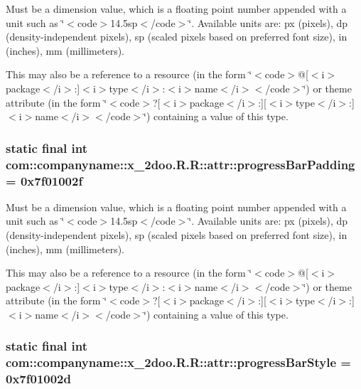 Must be a dimension value, which is a floating point number appended with a unit such as \char`\"{}$<$code$>$14.5sp$<$/code$>$\char`\"{}. Available units are: px (pixels), dp (density-independent pixels), sp (scaled pixels based on preferred font size), in (inches), mm (millimeters). 

This may also be a reference to a resource (in the form \char`\"{}$<$code$>$@\mbox{[}$<$i$>$package$<$/i$>$:\mbox{]}$<$i$>$type$<$/i$>$:$<$i$>$name$<$/i$>$$<$/code$>$\char`\"{}) or theme attribute (in the form \char`\"{}$<$code$>$?\mbox{[}$<$i$>$package$<$/i$>$:\mbox{]}\mbox{[}$<$i$>$type$<$/i$>$:\mbox{]}$<$i$>$name$<$/i$>$$<$/code$>$\char`\"{}) containing a value of this type. \hypertarget{classcom_1_1companyname_1_1x__2doo_1_1_r_1_1attr_95037778c73e5ec76da2313587e3f44f}{
\subsubsection[{progressBarPadding}]{\setlength{\rightskip}{0pt plus 5cm}static final int com::companyname::x\_\-2doo.R.R::attr::progressBarPadding = 0x7f01002f}}
\label{classcom_1_1companyname_1_1x__2doo_1_1_r_1_1attr_95037778c73e5ec76da2313587e3f44f}


Must be a dimension value, which is a floating point number appended with a unit such as \char`\"{}$<$code$>$14.5sp$<$/code$>$\char`\"{}. Available units are: px (pixels), dp (density-independent pixels), sp (scaled pixels based on preferred font size), in (inches), mm (millimeters). 

This may also be a reference to a resource (in the form \char`\"{}$<$code$>$@\mbox{[}$<$i$>$package$<$/i$>$:\mbox{]}$<$i$>$type$<$/i$>$:$<$i$>$name$<$/i$>$$<$/code$>$\char`\"{}) or theme attribute (in the form \char`\"{}$<$code$>$?\mbox{[}$<$i$>$package$<$/i$>$:\mbox{]}\mbox{[}$<$i$>$type$<$/i$>$:\mbox{]}$<$i$>$name$<$/i$>$$<$/code$>$\char`\"{}) containing a value of this type. \hypertarget{classcom_1_1companyname_1_1x__2doo_1_1_r_1_1attr_a1e12e08bf522ee404b749a5ab9a8b78}{
\subsubsection[{progressBarStyle}]{\setlength{\rightskip}{0pt plus 5cm}static final int com::companyname::x\_\-2doo.R.R::attr::progressBarStyle = 0x7f01002d}}
\label{classcom_1_1companyname_1_1x__2doo_1_1_r_1_1attr_a1e12e08bf522ee404b749a5ab9a8b78}


